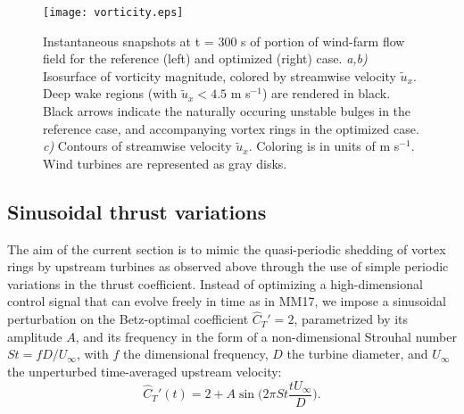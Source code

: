 \documentclass[wes, manuscript]{copernicus}
\newcommand{\cthat}{\widehat{C}_T'}
\begin{document}
\begin{figure}
	\centering
	\texttt{[image: vorticity.eps]}
	\caption{Instantaneous snapshots at t = 300 s of portion of wind-farm flow field for the reference (left) and optimized (right) case. \emph{a,b) } Isosurface of vorticity magnitude, colored by streamwise velocity $\widetilde{u}_x$. Deep wake regions (with $\widetilde{u}_x < 4.5$ m s$^{-1}$) are rendered in black. Black arrows indicate the naturally occuring unstable bulges in the reference case, and accompanying vortex rings in the optimized case. \emph{c)} Contours of streamwise velocity $\widetilde{u}_x$. Coloring is in units of m s$^{-1}$. Wind turbines are represented as gray disks. \label{fig:vorticity_windfarm}}
\end{figure}


\subsection{Sinusoidal thrust variations}\label{sec:opt_sinus}
The aim of the current section is to mimic the quasi-periodic shedding of vortex rings by upstream turbines as observed above through the use of simple periodic variations in the thrust coefficient. Instead of optimizing a high-dimensional control signal that can evolve freely in time as in MM17, we impose a sinusoidal perturbation on the Betz-optimal coefficient $\cthat = 2$, parametrized by its amplitude $A$, and its frequency in the form of a non-dimensional Strouhal number $St = f D/ U_\infty$, with $f$ the dimensional frequency, $D$ the turbine diameter, and $U_\infty$ the unperturbed time-averaged upstream velocity:
\begin{equation}
\cthat(t) = 2 + A \sin \bigg(2\pi St \frac{t U_\infty}{D} \bigg).\label{eq:define_thrust}
\end{equation}
\end{document}
